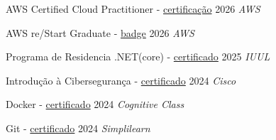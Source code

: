 
AWS Certified Cloud Practitioner -
\href{https://www.credly.com/badges/056377f7-51f5-45f7-8fa8-fd702868db72/public_url}
{certificação}	\hfill 2026
\textit{AWS}

AWS re/Start Graduate -
\href{https://www.credly.com/badges/2774d449-3692-4c6b-812a-b43fc6c1369b/public_url}
{badge}	\hfill 2026
\textit{AWS}

Programa de Residencia .NET(core) -
\href{https://drive.google.com/file/d/1QK2iDkPM1S0_32AeTde6WiRgCqKbhcO2/view?usp=sharing}
{certificado}	\hfill 2025
\textit{IUUL}

Introdução à Cibersegurança	-
\href{https://drive.google.com/file/d/1KYFN2zqi_Ak4W9jN4q5N5S_BwurvaFh5/view?usp=sharing}
{certificado}   \hfill 2024
\textit{Cisco}

Docker - 
\href{https://drive.google.com/file/d/1izS5KxO5hyYK_xB-KkLiAXdUGOazu_zA/view?usp=sharing}
{certificado}    \hfill 2024
\textit{Cognitive Class}

Git	-
\href{https://drive.google.com/file/d/1YjPaDSN5i6VCM5fPR5lM4CR2IeWlmYHq/view?usp=sharing}
{certificado}     \hfill 2024
\textit{Simplilearn}

